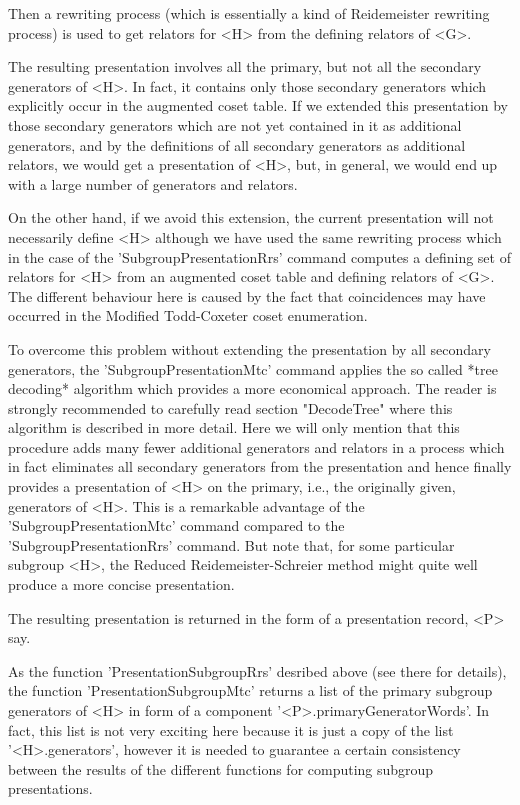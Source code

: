 Then  a  rewriting  process (which is essentially a kind of  Reidemeister
rewriting process) is used to  get  relators  for  <H>  from the defining
relators of <G>.

The resulting presentation involves  all  the  primary, but not  all  the
secondary generators of <H>.   In fact, it contains only those  secondary
generators which  explicitly occur in the augmented  coset table.  If  we
extended this presentation by those  secondary generators which  are  not
yet contained in it as additional generators,  and by the  definitions of
all  secondary   generators  as  additional  relators,  we  would  get  a
presentation of <H>, but, in general, we would end up with a large number
of generators and relators.

On the other hand, if  we  avoid this extension, the current presentation
will not necessarily define <H> although  we have used the same rewriting
process  which  in  the  case of  the  'SubgroupPresentationRrs'  command
computes a defining set of relators for <H> from an augmented coset table
and defining relators  of <G>.  The different behaviour here is caused by
the fact that coincidences may have occurred in the Modified Todd-Coxeter
coset enumeration.

To  overcome  this problem  without  extending  the presentation  by  all
secondary generators, the  'SubgroupPresentationMtc' command  applies the
so called  *tree decoding*  algorithm  which provides  a  more economical
approach.   The reader is  strongly recommended to carefully read section
"DecodeTree"  where this algorithm is  described in more detail.  Here we
will  only  mention  that  this  procedure  adds  many  fewer  additional
generators  and relators  in a  process  which  in  fact  eliminates  all
secondary generators from  the presentation and hence finally  provides a
presentation  of  <H>  on  the  primary,  i.e.,  the   originally  given,
generators   of  <H>.   This   is   a   remarkable   advantage   of   the
'SubgroupPresentationMtc'       command       compared       to       the
'SubgroupPresentationRrs'  command.   But note that, for  some particular
subgroup <H>, the  Reduced Reidemeister-Schreier method might quite  well
produce a more concise presentation.

The  resulting  presentation  is  returned in  the form of a presentation
record, <P> say.

As the function 'PresentationSubgroupRrs' desribed  above (see there  for
details), the function  'PresentationSubgroupMtc' returns  a list of  the
primary   subgroup generators    of    <H>   in form  of    a   component
'<P>.primaryGeneratorWords'. In fact, this list is not very exciting here
because it  is just a copy  of  the list '<H>.generators', however  it is
needed to  guarantee a  certain  consistency between  the results  of the
different functions for computing subgroup presentations.

